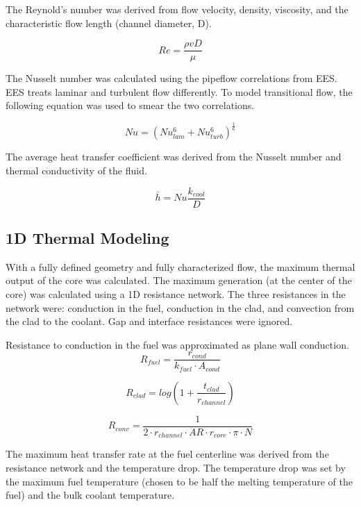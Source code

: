 The Reynold's number was derived from flow velocity, density, viscosity, and the
characteristic flow length (channel diameter, D).

\begin{equation}
    Re = \frac{\rho v D}{\mu}
\end{equation}

The Nusselt number was calculated using the pipeflow correlations from EES. EES
treats laminar and turbulent flow differently. To model transitional flow, the
following equation was used to smear the two correlations.

\begin{equation}
    Nu = (Nu_{lam}^6 + Nu_{turb}^6)^{\frac{1}{6}}
\end{equation}

The average heat transfer coefficient was derived from the Nusselt number and
thermal conductivity of the fluid.

\begin{equation}
    \bar{h} = Nu \frac{k_{cool}}{D}
\end{equation}

\subsection{1D Thermal Modeling}

With a fully defined geometry and fully characterized flow, the maximum thermal
output of the core was calculated. The maximum generation (at the center of the
core) was calculated using a 1D resistance network. The three resistances in the
network were: conduction in the fuel, conduction in the clad, and convection from
the clad to the coolant. Gap and interface resistances were ignored.

Resistance to conduction in the fuel was approximated as plane wall conduction.
\begin{equation}
    R_{fuel} =  \frac{r_{cond}}{k_{fuel}\cdot A_{cond}}
\end{equation}

\begin{equation}
    R_{clad} = log(1+\frac{t_{clad}}{r_{channel}})
\end{equation}

\begin{equation}
    R_{conv} = \frac{1}{2\cdot r_{channel}\cdot AR\cdot r_{core} \cdot \pi\cdot N}
\end{equation}

The maximum heat transfer rate at the fuel centerline was derived from the
resistance network and the temperature drop. The temperature drop was set
by the maximum fuel temperature (chosen to be half the melting temperature of
the fuel) and the bulk coolant temperature.

